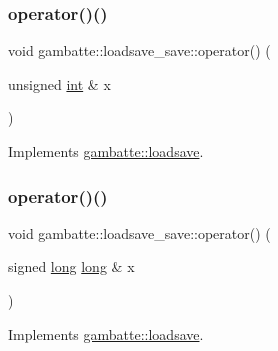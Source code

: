 \subsubsection{\texorpdfstring{operator()()}{operator()()}\hspace{0.1cm}{\footnotesize\ttfamily [7/19]}}
{\footnotesize\ttfamily void gambatte\+::loadsave\+\_\+save\+::operator() (\begin{DoxyParamCaption}\item[{unsigned \hyperlink{ioapi_8h_a787fa3cf048117ba7123753c1e74fcd6}{int} \&}]{x }\end{DoxyParamCaption})\hspace{0.3cm}{\ttfamily [virtual]}}



Implements \hyperlink{classgambatte_1_1loadsave_a263bbb4b470594752ca94548673e66a4}{gambatte\+::loadsave}.

\mbox{\label{classgambatte_1_1loadsave__save_a632b38781a3ce7198eb4ec079c9d1d12}} 
\subsubsection{\texorpdfstring{operator()()}{operator()()}\hspace{0.1cm}{\footnotesize\ttfamily [8/19]}}
{\footnotesize\ttfamily void gambatte\+::loadsave\+\_\+save\+::operator() (\begin{DoxyParamCaption}\item[{signed \hyperlink{ioapi_8h_a3c7b35ad9dab18b8310343c201f7b27e}{long} \hyperlink{ioapi_8h_a3c7b35ad9dab18b8310343c201f7b27e}{long} \&}]{x }\end{DoxyParamCaption})\hspace{0.3cm}{\ttfamily [virtual]}}



Implements \hyperlink{classgambatte_1_1loadsave_a882deed58830a077498c160ba2870eec}{gambatte\+::loadsave}.

\mbox{\label{classgambatte_1_1loadsave__save_a7249aea6e271152e391d8e7b0cc02533}} 
